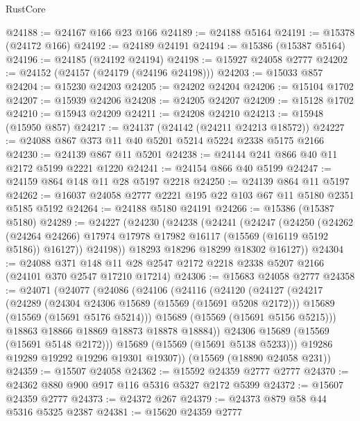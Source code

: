 \begin{lexlean}{RustCore}
\begin{coremodule}
@24188 := @24167 @166 @23 @166
@24189 := @24188 @5164
@24191 := @15378 (@24172 @166)
@24192 := @24189 @24191
@24194 := @15386 (@15387 @5164)
@24196 := @24185 (@24192 @24194)
@24198 := @15927 @24058 @2777
@24202 := @24152 (@24157 (@24179 (@24196 @24198)))
@24203 := @15033 @857
@24204 := @15230 @24203
@24205 := @24202 @24204
@24206 := @15104 @1702
@24207 := @15939 @24206
@24208 := @24205 @24207
@24209 := @15128 @1702
@24210 := @15943 @24209
@24211 := @24208 @24210
@24213 := @15948 (@15950 @857)
@24217 := @24137 (@24142 (@24211 @24213 @18572))
@24227 := @24088 @867 @373 @11 @40 @5201 @5214 @5224 @2338 @5175 @2166
@24230 := @24139 @867 @11 @5201
@24238 := @24144 @241 @866 @40 @11 @2172 @5199 @2221 @1220
@24241 := @24154 @866 @40 @5199
@24247 := @24159 @864 @148 @11 @28 @5197 @2218
@24250 := @24139 @864 @11 @5197
@24262 := @16037 @24058 @2777 @2221 @195 @22 @103 @67 @11 @5180 @2351 @5185 @5192
@24264 := @24188 @5180 @24191
@24266 := @15386 (@15387 @5180)
@24289 := @24227
    (@24230
      (@24238
        (@24241
          (@24247
            (@24250
              (@24262
                (@24264 @24266)
                @17974
                @17978
                @17982
                @16117
                (@15569 (@16119 @5192 @5186))
                @16127))
            @24198))
        @18293
        @18296
        @18299
        @18302
        @16127))
@24304 := @24088
    @371
    @148
    @11
    @28
    @2547
    @2172
    @2218
    @2338
    @5207
    @2166
    (@24101 @370 @2547 @17210 @17214)
@24306 := @15683 @24058 @2777
@24358 := @24071
    (@24077
      (@24086
        (@24106
          (@24116
            (@24120
              (@24127
                (@24217
                  (@24289
                    (@24304 @24306 @15689 (@15569 (@15691 @5208 @2172)))
                    @15689
                    (@15569 (@15691 @5176 @5214)))
                  @15689
                  (@15569 (@15691 @5156 @5215)))
                @18863
                @18866
                @18869
                @18873
                @18878
                @18884))
            @24306
            @15689
            (@15569 (@15691 @5148 @2172)))
          @15689
          (@15569 (@15691 @5138 @5233)))
        @19286
        @19289
        @19292
        @19296
        @19301
        @19307))
    (@15569 (@18890 @24058 @231))
@24359 := @15507 @24058
@24362 := @15592 @24359 @2777 @2777
@24370 := @24362 @880 @900 @917 @116 @5316 @5327 @2172 @5399
@24372 := @15607 @24359 @2777
@24373 := @24372 @267
@24379 := @24373 @879 @58 @44 @5316 @5325 @2387
@24381 := @15620 @24359 @2777

\end{coremodule}
\end{lexlean}
